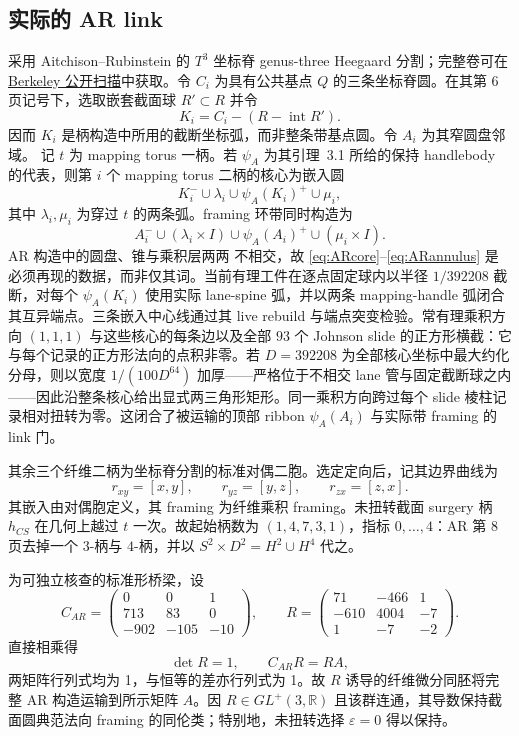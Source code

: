 \documentclass[11pt]{amsart}
\theoremstyle{definition}
\theoremstyle{remark}
\begin{document}
\subsection{实际的 AR link}

采用 Aitchison--Rubinstein
\cite[pp.~5--12]{AitchisonRubinstein1984} 的 $T^3$ 坐标脊 genus-three Heegaard 分割；完整卷可在
\href{https://math.berkeley.edu/~kirby/papers/Gordon%20and%20Kirby%20%28editors%29%20-%20Four-manifold%20theory%20%28Durham%29%20-%20MR0780574.pdf}
{Berkeley 公开扫描}中获取。令 $C_i$ 为具有公共基点 $Q$ 的三条坐标脊圆。在其第 6 页记号下，选取嵌套截面球 $R'\subset R$ 并令
\[
K_i=C_i-(R-\operatorname{int}R').
\]
因而 $K_i$ 是柄构造中所用的截断坐标弧，而非整条带基点圆。令 $A_i$ 为其窄圆盘邻域。
记 $t$ 为 mapping torus 一柄。若 $\psi_A$ 为其引理~3.1 所给的保持 handlebody 的代表，则第 $i$ 个 mapping torus 二柄的核心为嵌入圆
\begin{equation}\label{eq:ARcore}
K_i^-\cup\lambda_i\cup\psi_A(K_i)^+\cup\mu_i,
\end{equation}
其中 $\lambda_i,\mu_i$ 为穿过 $t$ 的两条弧。framing 环带同时构造为
\begin{equation}\label{eq:ARannulus}
A_i^-\cup(\lambda_i\times I)\cup\psi_A(A_i)^+
       \cup(\mu_i\times I).
\end{equation}
AR 构造中的圆盘、锥与乘积层两两
不相交，故 \eqref{eq:ARcore}--\eqref{eq:ARannulus} 是必须再现的数据，而非仅其词。当前有理工件在逐点固定球内以半径 $1/392208$ 截断，对每个 $\psi_A(K_i)$ 使用实际 lane-spine 弧，并以两条 mapping-handle 弧闭合其互异端点。三条嵌入中心线通过其 live rebuild 与端点突变检验。常有理乘积方向 $(1,1,1)$ 与这些核心的每条边以及全部 $93$ 个 Johnson slide 的正方形横截：它与每个记录的正方形法向的点积非零。若 $D=392208$ 为全部核心坐标中最大约化分母，则以宽度 $1/(100D^{64})$ 加厚——严格位于不相交 lane 管与固定截断球之内——因此沿整条核心给出显式两三角形矩形。同一乘积方向跨过每个 slide 棱柱记录相对扭转为零。这闭合了被运输的顶部 ribbon $\psi_A(A_i)$ 与实际带 framing 的 link 门。

其余三个纤维二柄为坐标脊分割的标准对偶二胞。选定定向后，记其边界曲线为
\[
r_{xy}=[x,y],\qquad r_{yz}=[y,z],\qquad r_{zx}=[z,x].
\]
其嵌入由对偶胞定义，其 framing 为纤维乘积 framing。未扭转截面 surgery 柄 $h_{CS}$ 在几何上越过 $t$ 一次。故起始柄数为
$(1,4,7,3,1)$，指标 $0,\ldots,4$：AR 第 8 页去掉一个 $3$-柄与
$4$-柄，并以 $S^2\times D^2=H^2\cup H^4$ 代之。

为可独立核查的标准形桥梁，设
\[
C_{AR}=\begin{pmatrix}0&0&1\\713&83&0\\-902&-105&-10\end{pmatrix},
\qquad
R=\begin{pmatrix}71&-466&1\\-610&4004&-7\\1&-7&-2\end{pmatrix}.
\]
直接相乘得
\[
\det R=1,\qquad C_{AR}R=RA,
\]
两矩阵行列式均为 1，与恒等的差亦行列式为 1。故 $R$ 诱导的纤维微分同胚将完整 AR 构造运输到所示矩阵 $A$。因
$R\in GL^+(3,\mathbb R)$ 且该群连通，其导数保持截面圆典范法向 framing 的同伦类；特别地，未扭转选择 $\varepsilon=0$ 得以保持。
\end{document}
